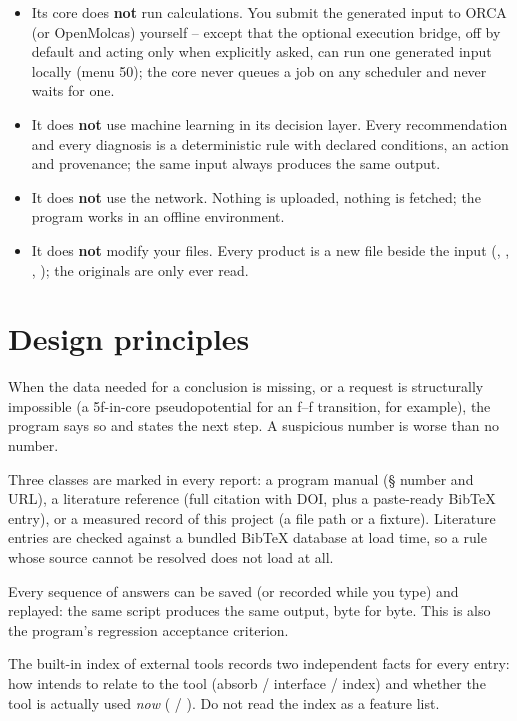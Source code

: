 \begin{refusalbox}
\begin{itemize}
  \item Its core does \textbf{not} run calculations. You submit the generated
    input to ORCA (or OpenMolcas) yourself -- except that the optional execution
    bridge, off by default and acting only when explicitly asked, can run one
    generated input locally (menu 50); the core never queues a job on any
    scheduler and never waits for one.
  \item It does \textbf{not} use machine learning in its decision layer. Every
    recommendation and every diagnosis is a deterministic rule with declared
    conditions, an action and provenance; the same input always produces the
    same output.
  \item It does \textbf{not} use the network. Nothing is uploaded, nothing is
    fetched; the program works in an offline environment.
  \item It does \textbf{not} modify your files. Every product is a new file
    beside the input (, , ,
    ); the originals are only ever read.
\end{itemize}
\end{refusalbox}

\section{Design principles}

\begin{description}[leftmargin=1.6em]
  \item[Refuse rather than guess.] When the data needed for a conclusion is
    missing, or a request is structurally impossible (a 5f-in-core
    pseudopotential for an f--f transition, for example), the program says so
    and states the next step. A suspicious number is worse than no number.
  \item[Everything carries provenance.] Three classes are marked in every
    report: a program manual (§ number and URL), a literature reference (full
    citation with DOI, plus a paste-ready BibTeX entry), or a measured record
    of this project (a file path or a fixture). Literature entries are checked
    against a bundled BibTeX database at load time, so a rule whose source
    cannot be resolved does not load at all.
  \item[The interaction is a script.] Every sequence of answers can be saved
    (or recorded while you type) and replayed: the same script produces the
    same output, byte for byte. This is also the program's regression
    acceptance criterion.
  \item[Registration is not use.] The built-in index of external tools records
    two independent facts for every entry: how \fbk{} intends to relate to the
    tool (absorb / interface / index) and whether the tool is actually used
    \emph{now} ( / ). Do not read the index as a
    feature list.
\end{description}

